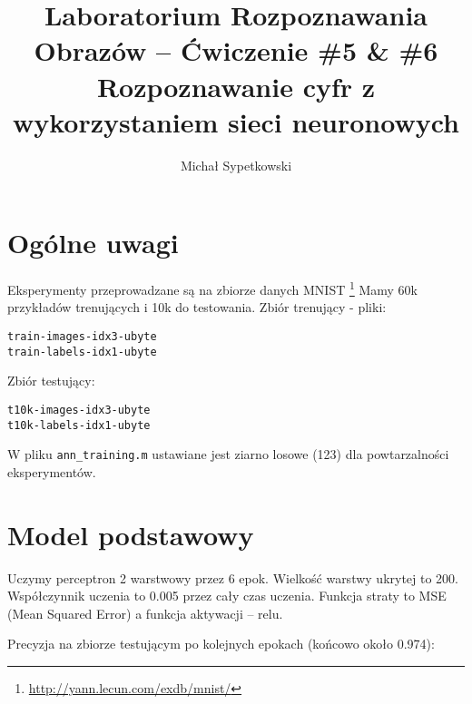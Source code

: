 \documentclass[a4paper]{article}
\begin{document}
\title{ Laboratorium Rozpoznawania Obrazów – Ćwiczenie \#5 \& \#6 Rozpoznawanie cyfr z wykorzystaniem sieci neuronowych}



\author{Michał Sypetkowski}
\twocolumn
\maketitle


\section{Ogólne uwagi}
Eksperymenty przeprowadzane są na zbiorze danych MNIST
\footnote{\url{http://yann.lecun.com/exdb/mnist/}}
Mamy 60k przykładów trenujących i 10k do testowania.
Zbiór trenujący - pliki:
\begin{verbatim}
train-images-idx3-ubyte
train-labels-idx1-ubyte
\end{verbatim}

Zbiór testujący:
\begin{verbatim}
t10k-images-idx3-ubyte
t10k-labels-idx1-ubyte
\end{verbatim}

W pliku \texttt{ann\_training.m} ustawiane jest ziarno losowe (123) dla powtarzalności eksperymentów.

\section{Model podstawowy}

Uczymy perceptron 2 warstwowy przez 6 epok.
Wielkość warstwy ukrytej to 200.
Współczynnik uczenia to 0.005 przez cały czas uczenia.
Funkcja straty to MSE (Mean Squared Error) a funkcja aktywacji -- relu.

Precyzja na zbiorze testującym po kolejnych epokach (końcowo około 0.974):

\begin{center}
\end{center}
\end{document}
